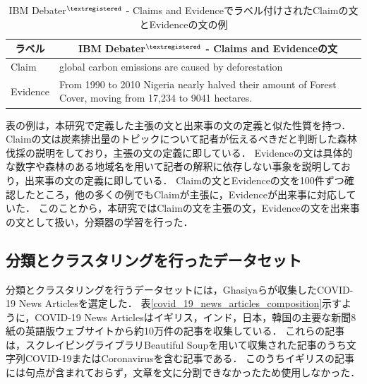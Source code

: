 \documentclass[12pt,a4j,dvipdfmx]{jreport}
\begin{document}
\begin{table}[H]
  \caption{IBM Debater$^{\textregistered}$ - Claims and Evidenceでラベル付けされたClaimの文とEvidenceの文の例}
  \vspace{4mm}
  \centering
  \begin{tabular}{lp{12.3cm}}
    \hline
    \multicolumn{1}{c}{ラベル} & \multicolumn{1}{c}{IBM Debater$^{\textregistered}$ - Claims and Evidenceの文}
    \\
    \hline
    Claim & global carbon emissions are caused by deforestation
    \\
    Evidence & \baselineskip=16pt
    From 1990 to 2010 Nigeria nearly halved their amount of Forest Cover, moving from 17,234 to 9041 hectares.
    \\[0.5mm]
    \hline
  \end{tabular}
  \label{claim_evidence_example}
\end{table}

\newpage

表の例は，本研究で定義した主張の文と出来事の文の定義と似た性質を持つ．
Claimの文は炭素排出量のトピックについて記者が伝えるべきだと判断した森林伐採の説明をしており，主張の文の定義に即している．
Evidenceの文は具体的な数字や森林のある地域名を用いて記者の解釈に依存しない事象を説明しており，出来事の文の定義に即している．
Claimの文とEvidenceの文を100件ずつ確認したところ，他の多くの例でもClaimが主張に，Evidenceが出来事に対応していた．
このことから，本研究ではClaimの文を主張の文，Evidenceの文を出来事の文として扱い，分類器の学習を行った．


\subsection{分類とクラスタリングを行ったデータセット}
分類とクラスタリングを行うデータセットには，Ghasiyaらが収集したCOVID-19 News Articlesを選定した\cite{ghasiya_investigating_2021}．
表\ref{covid_19_news_articles_composition}示すように，COVID-19 News Articlesはイギリス，インド，日本，韓国の主要な新聞8紙の英語版ウェブサイトから約10万件の記事を収集している．
これらの記事は，スクレイピングライブラリBeautiful Soupを用いて収集された記事のうち文字列COVID-19またはCoronavirusを含む記事である．
このうちイギリスの記事には句点が含まれておらず，文章を文に分割できなかったため使用しなかった．
\end{document}
